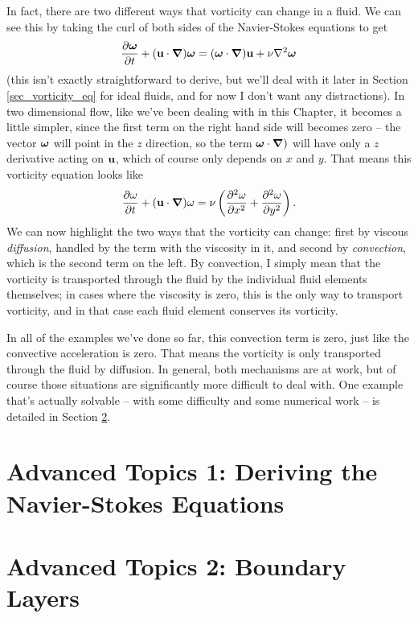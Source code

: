 In fact, there are two different ways that vorticity can change in a fluid.  We can see this by taking the curl of both sides of the Navier-Stokes equations to get
\begin{equation}
\frac{\partial {\boldsymbol{\omega}}}{\partial {t}} + (\mathbf{u} \cdot \boldsymbol{\nabla}) \boldsymbol{\omega} = (\boldsymbol{\omega} \cdot \boldsymbol{\nabla}) \mathbf{u} + \nu \nabla^2 \boldsymbol{\omega}
\end{equation}
(this isn't exactly straightforward to derive, but we'll deal with it later in Section \ref{sec_vorticity_eq} for ideal fluids, and for now I don't want any distractions).  In two dimensional flow, like we've been dealing with in this Chapter, it becomes a little simpler, since the first term on the right hand side will becomes zero -- the vector $\boldsymbol{\omega}$ will point in the $z$ direction, so the term $\boldsymbol{\omega} \cdot \boldsymbol{\nabla})$ will have only a $z$ derivative acting on $\mathbf{u}$, which of course only depends on $x$ and $y$.  That means this vorticity equation looks like
\[
\frac{\partial {\omega}}{\partial {t}} + (\mathbf{u}  \cdot \boldsymbol{\nabla}) \omega = \nu \left( \frac{\partial^2 {\omega}}{\partial {x}^2} + \frac{\partial^2 {\omega}}{\partial {y}^2} \right).
\]
We can now highlight the two ways that the vorticity can change:  first by viscous \emph{diffusion}, handled by the term with the viscosity in it, and second by \emph{convection}, which is the second term on the left.  By convection, I simply mean that the vorticity is transported through the fluid by the individual fluid elements themselves; in cases where the viscosity is zero, this is the only way to transport vorticity, and in that case each fluid element conserves its vorticity.

In all of the examples we've done so far, this convection term is zero, just like the convective acceleration is zero.  That means the vorticity is only transported through the fluid by diffusion.  In general, both mechanisms are at work, but of course those situations are significantly more difficult to deal with.  One example that's actually solvable -- with some difficulty and some numerical work -- is detailed in Section \ref{sec_boundary_layers}.

%
% 

\section{Advanced Topics 1: Deriving the Navier-Stokes Equations}
\label{sec_ns_deriv}

%
% 

\section{Advanced Topics 2: Boundary Layers}
\label{sec_boundary_layers}

